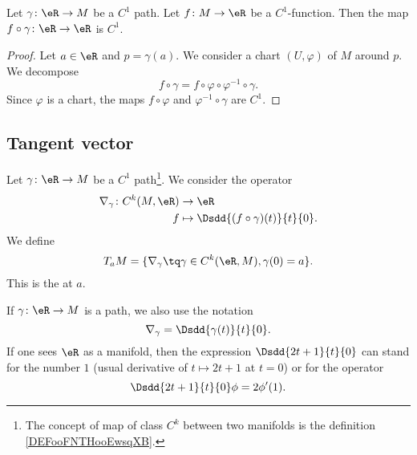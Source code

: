 \begin{lemma}
    Let \( \gamma\colon \eR\to M\) be a \( C^1\) path. Let \( f\colon M\to \eR\) be a \( C^1\)-function. Then the map \( f\circ \gamma\colon \eR\to \eR\) is \( C^1\).   
\end{lemma}

\begin{proof}
    Let \( a\in \eR\) and \( p=\gamma(a)\). We consider a chart \( (U,\varphi)\) of \( M\) around \( p\). We decompose
    \begin{equation}
        f\circ \gamma= f\circ \varphi\circ \varphi^{-1}\circ\gamma.
    \end{equation}
    Since \( \varphi\) is a chart, the maps \( f\circ\varphi\) and \( \varphi^{-1}\circ\gamma\) are \( C^1\).
\end{proof}


\subsection{Tangent vector}

\begin{definition}      \label{DEFooJJVIooDUBwDJ}
    Let \( \gamma\colon \eR\to M\) be a \( C^1\) path\footnote{The concept of map of class \( C^k\) between two manifolds is the definition \ref{DEFooFNTHooEwsqXB}.}. We consider the operator
    \begin{equation}
        \begin{aligned}
            \nabla_{\gamma}\colon C^k(M,\eR)&\to \eR \\
            f&\mapsto \Dsdd{ (f\circ\gamma)(t) }{t}{0}. 
        \end{aligned}
    \end{equation}
    We define
    \begin{equation}
        T_aM=\{ \nabla_{\gamma}\tq \gamma\in C^k(\eR,M),\gamma(0)=a \}.
    \end{equation}
    This is the  at \( a\).
\end{definition}

If \( \gamma\colon \eR\to M\) is a path, we also use the notation
\begin{equation}        \label{EQooJQVRooLziKoH}
    \nabla_{\gamma}=\Dsdd{ \gamma(t) }{t}{0}.
\end{equation}
If one sees \( \eR\) as a manifold, then the expression \( \Dsdd{ 2t+1 }{t}{0}\) can stand for the number \( 1\) (usual derivative of \( t\mapsto 2t+1\) at \( t=0\)) or for the operator
\begin{equation}
    \Dsdd{ 2t+1 }{t}{0}\phi=2\phi'(1).
\end{equation}

